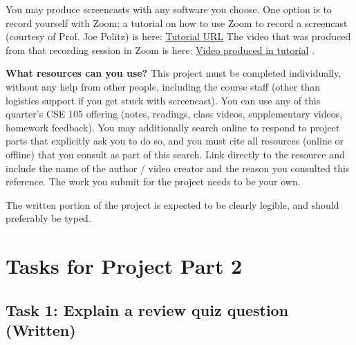  You may produce screencasts with any software you choose. One option is to record yourself 
 with Zoom; a tutorial on how to use Zoom to record a screencast (courtesy of Prof. Joe Politz) is 
 here: \href{https://drive.google.com/open?id=1KROMAQuTCk40zwrEFotlYSJJQdcG_GUU}{Tutorial URL}
 The video that was produced from that recording session in Zoom is here:
 \href{{https://drive.google.com/open?id=1MxJN6CQcXqIbOekDYMxjh7mTt1TyRVMl}}{Video produced in tutorial} .
 
 {\bf What resources can you use? }
 This project must be completed individually, without any help from other people, 
 including the course staff (other than logistics support if you get stuck with screencast). 
 You can use any of this quarter’s CSE 105 offering (notes, readings, class videos, 
 supplementary videos, homework feedback). You may additionally search online to respond to 
 project parts that explicitly ask you to do so, and you must  cite all resources (online or offline) 
 that you consult as part of this search. Link directly to the resource and include the name of the 
 author / video creator and the reason you consulted this reference. The work you submit for the 
 project needs to be your own. 
 
The written portion of the project is expected to be clearly legible, and should preferably be typed.

 \newpage
 \section{Tasks for Project Part 2}


 \subsection{Task 1: Explain a review quiz question (Written)}
	

